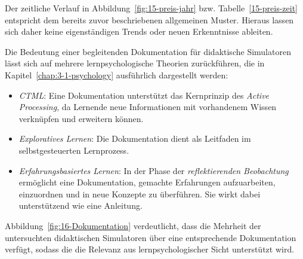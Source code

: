 Der zeitliche Verlauf in Abbildung~\ref{fig:15-preis-jahr} bzw. Tabelle~\ref{15-preis-zeit} entspricht dem bereits zuvor beschriebenen allgemeinen Muster. Hieraus lassen sich daher keine eigenständigen Trends oder neuen Erkenntnisse ableiten.

Die Bedeutung einer begleitenden Dokumentation für didaktische Simulatoren lässt sich auf mehrere lernpsychologische Theorien zurückführen, die in Kapitel~\ref{chap:3-1-psychology} ausführlich dargestellt werden:

\begin{itemize}
    \item \textit{\ac{CTML}}: Eine Dokumentation unterstützt das Kernprinzip des \textit{Active Processing}, da Lernende neue Informationen mit vorhandenem Wissen verknüpfen und erweitern können.
    \item \textit{Exploratives Lernen}: Die Dokumentation dient als Leitfaden im selbstgesteuerten Lernprozess.
    \item \textit{Erfahrungsbasiertes Lernen}: In der Phase der \textit{reflektierenden Beobachtung} ermöglicht eine Dokumentation, gemachte Erfahrungen aufzuarbeiten, einzuordnen und in neue Konzepte zu überführen. Sie wirkt dabei unterstützend wie eine Anleitung.
\end{itemize}

Abbildung~\ref{fig:16-Dokumentation} verdeutlicht, dass die Mehrheit der untersuchten didaktischen Simulatoren über eine entsprechende Dokumentation verfügt, sodass die die Relevanz aus lernpsychologischer Sicht unterstützt wird.
			
